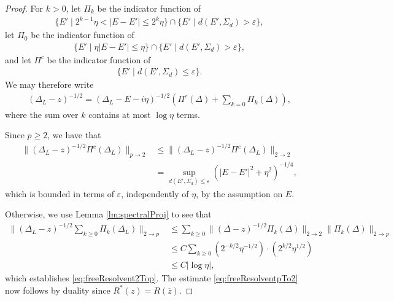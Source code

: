 \documentclass[11pt]{amsart}
\def\eps{{\varepsilon}}
\numberwithin{equation}{section}
\numberwithin{theorem}{section}
\begin{document}
\begin{proof}
For $k>0$, let $\Pi_k$ be the indicator function of
\begin{align*}
\{E' \mid 2^{k-1}\eta<|E-E'|\leq 2^{k}\eta\} \cap \{E' \mid d(E',\Sigma_d)>\eps\},
\end{align*}
let $\Pi_0$ be the indicator function of
\begin{align*}
\{E' \mid \eta|E-E'|\leq \eta\} \cap \{E' \mid d(E',\Sigma_d)>\eps\},
\end{align*}
and let $\Pi^c$ be the indicator function of
\begin{align*}
\{E' \mid d(E',\Sigma_d)\leq \eps\}.
\end{align*}
We may therefore write
\begin{align*}
(\Delta_L - z)^{-1 /2}=(\Delta_L - E - i\eta)^{-1 /2}
\left( \Pi^c(\Delta)+ \sum_{k=0}\Pi_k(\Delta)\right) ,
\end{align*}
where the sum over $k$ contains at most $\log \eta$ terms.

Since $p\geq 2$, we have that
\begin{align*}
\|(\Delta_L - z)^{-1 /2}\Pi^c(\Delta_L)\|_{p \to 2}&\leq
\|(\Delta_L - z)^{-1 /2}\Pi^c(\Delta_L)\|_{2 \to 2}\\
&=\sup_{d(E',\Sigma_d)\leq \eps}\left( |E-E'|^2+\eta^2 \right)^{-1 /4},
\end{align*}
which is bounded in terms of $\eps$, independently of $\eta$, by the assumption on $E$.

Otherwise, we use Lemma \ref{lm:spectralProj} to see that
\begin{align*}
\|(\Delta_L-z)^{-1 /2}\sum_{k\geq 0}\Pi_k(\Delta_L)\|_{2\to p}&\leq
\sum_{k\geq 0}\|(\Delta-z)^{-1 /2}\Pi_k(\Delta)\|_{2\to 2}\|\Pi_k(\Delta)\|_{2\to p}\\
&\leq C \sum_{k\geq 0}(2^{-k /2}\eta^{-1 /2})\cdot (2^{k /2} \eta^{1 /2} )\\
&\leq C|\log\eta|,
\end{align*}
which establishes \eqref{eq:freeResolvent2Top}.
The estimate \eqref{eq:freeResolventpTo2} now follows by duality since $R^*(z)=R(\overline{z})$.
\end{proof}
\end{document}
